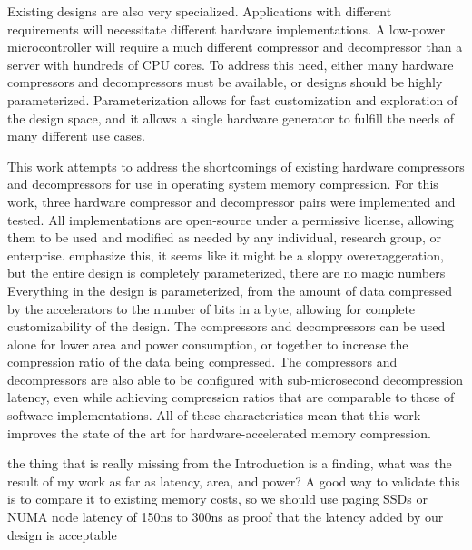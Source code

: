 \documentclass[doublespace,draft,nopageskip]{VTthesis} %
\begin{document}
Existing designs are also very specialized. Applications with different requirements will necessitate different hardware implementations. A low-power microcontroller will require a much different compressor and decompressor than a server with hundreds of CPU cores. To address this need, either many hardware compressors and decompressors must be available, or designs should be highly parameterized. Parameterization allows for fast customization and exploration of the design space, and it allows a single hardware generator to fulfill the needs of many different use cases.

This work attempts to address the shortcomings of existing hardware compressors and decompressors for use in operating system memory compression. For this work, three hardware compressor and decompressor pairs were implemented and tested. All implementations are open-source under a permissive license, allowing them to be used and modified as needed by any individual, research group, or enterprise. {\color{red} emphasize this, it seems like it might be a sloppy overexaggeration, but the entire design is completely parameterized, there are no magic numbers} Everything in the design is parameterized, from the amount of data compressed by the accelerators to the number of bits in a byte, allowing for complete customizability of the design. The compressors and decompressors can be used alone for lower area and power consumption, or together to increase the compression ratio of the data being compressed. The compressors and decompressors are also able to be configured with sub-microsecond decompression latency, even while achieving compression ratios that are comparable to those of software implementations. All of these characteristics mean that this work improves the state of the art for hardware-accelerated memory compression.

{\color{red} the thing that is really missing from the Introduction is a finding, what was the result of my work as far as latency, area, and power? A good way to validate this is to compare it to existing memory costs, so we should use paging SSDs or NUMA node latency of 150ns to 300ns as proof that the latency added by our design is acceptable}
	
\end{document}
